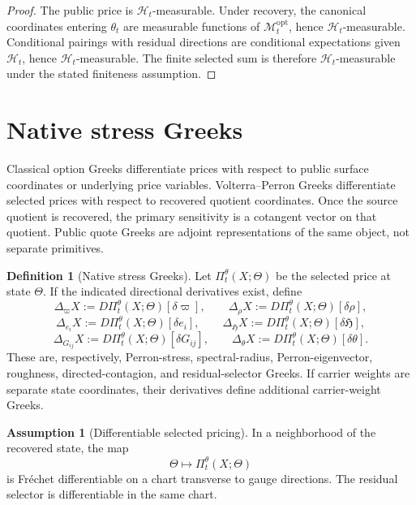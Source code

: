 \documentclass[11pt,a4paper]{amsart}
\theoremstyle{plain}
\theoremstyle{definition}
\newtheorem{definition}[theorem]{Definition}
\newtheorem{assumption}[theorem]{Assumption}
\theoremstyle{remark}
\newcommand{\cH}{\mathcal{H}}
\newcommand{\cM}{\mathcal{M}}
\begin{document}
\begin{proof}
The public price is \(\cH_t\)-measurable.  Under recovery, the canonical coordinates entering
\(\theta_t\) are measurable functions of \(\cM_t^{\mathrm{opt}}\), hence \(\cH_t\)-measurable.
Conditional pairings with residual directions are conditional expectations given \(\cH_t\), hence
\(\cH_t\)-measurable.  The finite selected sum is therefore \(\cH_t\)-measurable under the stated
finiteness assumption.
\end{proof}

\section{Native stress Greeks}\label{sec:greeks}

Classical option Greeks differentiate prices with respect to public surface coordinates or
underlying price variables.  Volterra--Perron Greeks differentiate selected prices with respect to
recovered quotient coordinates.  Once the source quotient is recovered, the primary sensitivity is
a cotangent vector on that quotient.  Public quote Greeks are adjoint representations of the same
object, not separate primitives.

\begin{definition}[Native stress Greeks]\label{def:native-greeks}
Let \(\Pi_t^\theta(X;\Theta)\) be the selected price at state \(\Theta\).  If the indicated
directional derivatives exist, define
\[
        \Delta_\varpi X
        :=
        D\Pi_t^\theta(X;\Theta)[\delta\varpi],
        \qquad
        \Delta_\rho X
        :=
        D\Pi_t^\theta(X;\Theta)[\delta\rho],
\]
\[
        \Delta_{e_i} X
        :=
        D\Pi_t^\theta(X;\Theta)[\delta e_i],
        \qquad
        \Delta_{\mathfrak H} X
        :=
        D\Pi_t^\theta(X;\Theta)[\delta\mathfrak H],
\]
\[
        \Delta_{G_{ij}} X
        :=
        D\Pi_t^\theta(X;\Theta)[\delta G_{ij}],
        \qquad
        \Delta_\theta X
        :=
        D\Pi_t^\theta(X;\Theta)[\delta\theta].
\]
These are, respectively, Perron-stress, spectral-radius, Perron-eigenvector, roughness,
directed-contagion, and residual-selector Greeks.  If carrier weights are separate state
coordinates, their derivatives define additional carrier-weight Greeks.
\end{definition}

\begin{assumption}[Differentiable selected pricing]\label{ass:differentiable-pricing}
In a neighborhood of the recovered state, the map
\[
        \Theta\mapsto \Pi_t^\theta(X;\Theta)
\]
is Fr\'echet differentiable on a chart transverse to gauge directions.  The residual selector is
differentiable in the same chart.
\end{assumption}
\end{document}
